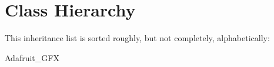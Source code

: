 \section{Class Hierarchy}
This inheritance list is sorted roughly, but not completely, alphabetically\+:\begin{DoxyCompactList}
\item Adafruit\+\_\+\+G\+FX\begin{DoxyCompactList}
\item {}
\begin{DoxyCompactList}
\item {}
\item {}
\end{DoxyCompactList}
\end{DoxyCompactList}
\end{DoxyCompactList}

